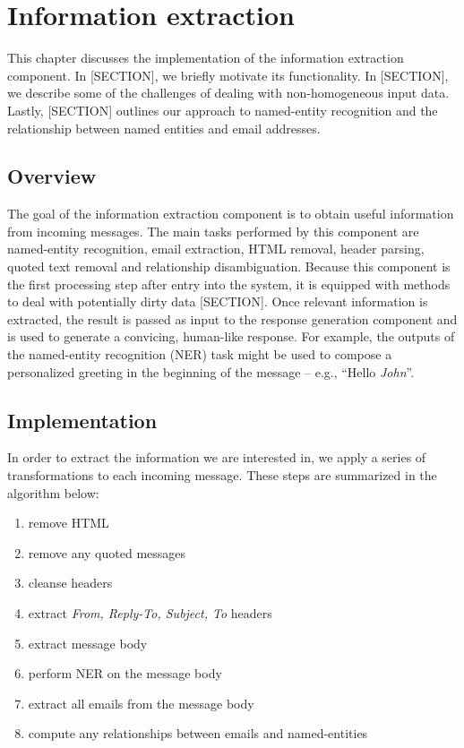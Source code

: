\chapter{Information extraction}
This chapter discusses the implementation of the information extraction component. In [SECTION], we briefly motivate its functionality. In [SECTION], we describe some of the challenges of dealing with non-homogeneous input data. Lastly, [SECTION] outlines our approach to named-entity recognition and the relationship between named entities and email addresses.

\section{Overview}
The goal of the information extraction component is to obtain useful information from incoming messages. The main tasks performed by this component are named-entity recognition, email extraction, HTML removal, header parsing, quoted text removal and relationship disambiguation. Because this component is the first processing step after entry into the system, it is equipped with methods to deal with potentially dirty data [SECTION]. Once relevant information is extracted, the result is passed as input to the response generation component and is used to generate a convicing, human-like response. For example, the outputs of the named-entity recognition (NER) task might be used to compose a personalized greeting in the beginning of the message -- e.g., ``Hello \emph{John}''.

\section{Implementation}
In order to extract the information we are interested in, we apply a series of transformations to each incoming message. These steps are summarized in the algorithm below:
\begin{enumerate}
\item remove HTML %
\vspace{-5mm}
\item remove any quoted messages %
\vspace{-5mm}
\item cleanse headers %
\vspace{-5mm}
\item extract \textit{From, Reply-To, Subject, To} headers %
\vspace{-5mm}
\item extract message body %
\vspace{-5mm}
\item perform NER on the message body %
\vspace{-5mm}
\item extract all emails from the message body %
\vspace{-5mm}
\item compute any relationships between emails and named-entities %
\end{enumerate}

